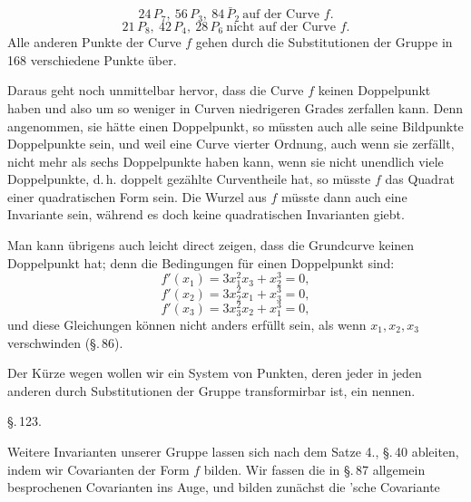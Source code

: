 \[
24\,P_7,\ 56\,P_3,\ 84\,\bar P_2 \ \text{auf der Curve } f.
\]
\[
21\,P_8,\ 42\,P_4,\ 28\,P_6 \ \text{nicht auf der Curve } f.
\]
Alle anderen Punkte der Curve $f$ gehen durch die Substitutionen der
Gruppe in 168 verschiedene Punkte über.

Daraus geht noch unmittelbar hervor, dass die Curve $f$ keinen
Doppelpunkt haben und also um so weniger in Curven niedrigeren Grades
zerfallen kann. Denn angenommen, sie hätte einen Doppelpunkt, so
müssten auch alle seine Bildpunkte Doppelpunkte sein, und weil eine
Curve vierter Ordnung, auch wenn sie zerfällt, nicht mehr als sechs
Doppelpunkte haben kann, wenn sie nicht unendlich viele Doppelpunkte,
d.\,h. doppelt gezählte Curventheile hat, so müsste $f$ das Quadrat
einer quadratischen Form sein. Die Wurzel aus $f$ müsste dann auch
eine Invariante sein, während es doch keine quadratischen Invarianten
giebt.

Man kann übrigens auch leicht direct zeigen, dass die Grundcurve
keinen Doppelpunkt hat; denn die Bedingungen für einen Doppelpunkt
sind:
\[
f'(x_1) = 3x_1^2x_3 + x_2^3 = 0,
\]
\[
f'(x_2) = 3x_2^2x_1 + x_3^3 = 0,
\]
\[
f'(x_3) = 3x_3^2x_2 + x_1^3 = 0,
\]
und diese Gleichungen können nicht anders erfüllt sein, als wenn
$x_1, x_2, x_3$ verschwinden (\S.\,86).

Der Kürze wegen wollen wir ein System von Punkten, deren jeder in
jeden anderen durch Substitutionen der Gruppe transformirbar ist, ein
 nennen.

\S.\,123.


Weitere Invarianten unserer Gruppe lassen sich nach dem Satze 4.,
\S.\,40 ableiten, indem wir Covarianten der Form $f$ bilden. Wir
fassen die in \S.\,87 allgemein besprochenen Covarianten ins Auge, und
bilden zunächst die 'sche Covariante
